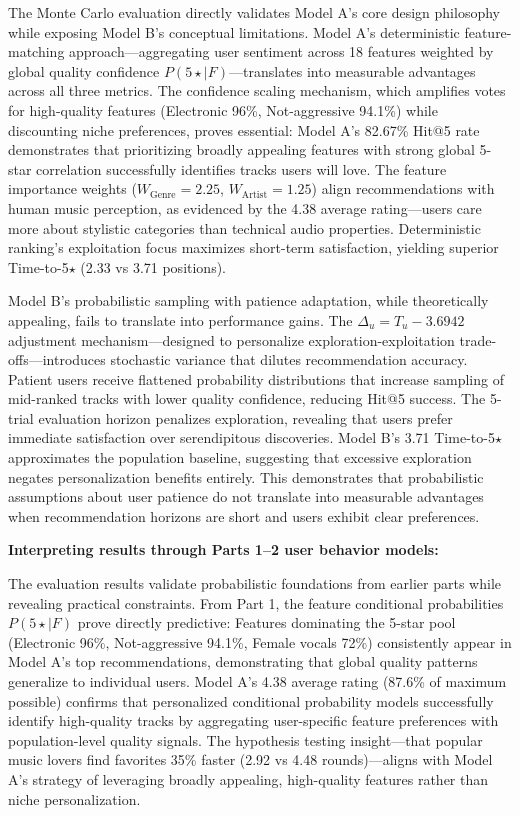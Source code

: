 \documentclass[12pt,a4paper]{article}
\begin{document}
The Monte Carlo evaluation directly validates Model A's core design philosophy while exposing Model B's conceptual limitations. Model A's deterministic feature-matching approach—aggregating user sentiment across 18 features weighted by global quality confidence $P(5\star \mid F)$—translates into measurable advantages across all three metrics. The confidence scaling mechanism, which amplifies votes for high-quality features (Electronic 96\%, Not-aggressive 94.1\%) while discounting niche preferences, proves essential: Model A's 82.67\% Hit@5 rate demonstrates that prioritizing broadly appealing features with strong global 5-star correlation successfully identifies tracks users will love. The feature importance weights ($W_{\text{Genre}} = 2.25$, $W_{\text{Artist}} = 1.25$) align recommendations with human music perception, as evidenced by the 4.38 average rating—users care more about stylistic categories than technical audio properties. Deterministic ranking's exploitation focus maximizes short-term satisfaction, yielding superior Time-to-5$\star$ (2.33 vs 3.71 positions).

Model B's probabilistic sampling with patience adaptation, while theoretically appealing, fails to translate into performance gains. The $\Delta_u = T_u - 3.6942$ adjustment mechanism—designed to personalize exploration-exploitation trade-offs—introduces stochastic variance that dilutes recommendation accuracy. Patient users receive flattened probability distributions that increase sampling of mid-ranked tracks with lower quality confidence, reducing Hit@5 success. The 5-trial evaluation horizon penalizes exploration, revealing that users prefer immediate satisfaction over serendipitous discoveries. Model B's 3.71 Time-to-5$\star$ approximates the population baseline, suggesting that excessive exploration negates personalization benefits entirely. This demonstrates that probabilistic assumptions about user patience do not translate into measurable advantages when recommendation horizons are short and users exhibit clear preferences.

\textbf{Interpreting results through Parts 1–2 user behavior models:}

The evaluation results validate probabilistic foundations from earlier parts while revealing practical constraints. From Part 1, the feature conditional probabilities $P(5\star \mid F)$ prove directly predictive: Features dominating the 5-star pool (Electronic 96\%, Not-aggressive 94.1\%, Female vocals 72\%) consistently appear in Model A's top recommendations, demonstrating that global quality patterns generalize to individual users. Model A's 4.38 average rating (87.6\% of maximum possible) confirms that personalized conditional probability models successfully identify high-quality tracks by aggregating user-specific feature preferences with population-level quality signals. The hypothesis testing insight—that popular music lovers find favorites 35\% faster (2.92 vs 4.48 rounds)—aligns with Model A's strategy of leveraging broadly appealing, high-quality features rather than niche personalization.
\end{document}
